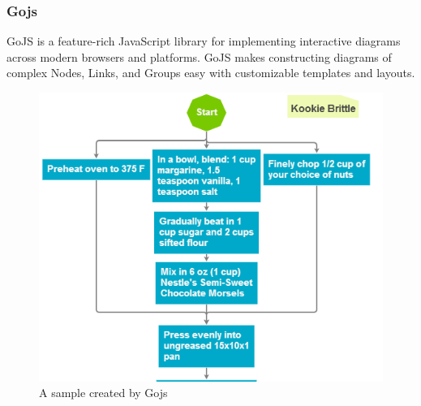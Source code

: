 \documentclass[14pt,a4paper]{extreport}
\begin{document}
 			\subsubsection{Gojs}
 			GoJS is a feature-rich JavaScript library for implementing interactive diagrams across modern browsers and platforms. GoJS makes constructing diagrams of complex Nodes, Links, and Groups easy with customizable templates and layouts.
 			\begin{figure}[ht]
 					\begin{center}
 						\includegraphics[scale=0.5]{gojs.png}
 						\caption{A sample created by Gojs}
 					\end{center}
 				\end{figure} 	
\end{document}
